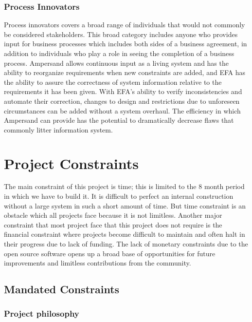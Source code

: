 \documentclass[12pt]{report}
\begin{document}
\subsection{Process Innovators}
Process innovators covers a broad range of individuals that would not commonly 
be considered stakeholders. This broad category includes anyone who provides 
input for business processes which includes both sides of a business agreement, 
in addition to individuals who play a role in seeing the completion of a 
business process. Ampersand allows continuous input as a living system and has 
the ability to reorganize requirements when new constraints are added, and 
EFA has the ability to assure the correctness of system information relative 
to the requirements it has been given. With EFA's ability to verify 
inconsistencies and automate their correction, changes to design and 
restrictions due to unforeseen circumstances can be added without a system 
overhaul. The efficiency in which Ampersand can provide has the potential to 
dramatically decrease flaws that commonly litter information system.


\chapter{Project Constraints}\label{ch:Constraints}
The main constraint of this project is time; this is limited to the 8 month 
period in which we have to build it. It is difficult to perfect an internal 
construction without a large system in such a short amount of time. But time 
constraint is an obstacle which all projects face because it is not limitless. 
Another major constraint that most project face that this project does not 
require is the financial constraint where projects become difficult to maintain 
and often halt in their progress due to lack of funding. The lack of 
monetary constraints due to the open source software opens up a broad base of 
opportunities for future improvements and limitless contributions from the 
community.
\section{Mandated Constraints}\label{sec:Constraints}

\subsection{Project philosophy}
\end{document}

